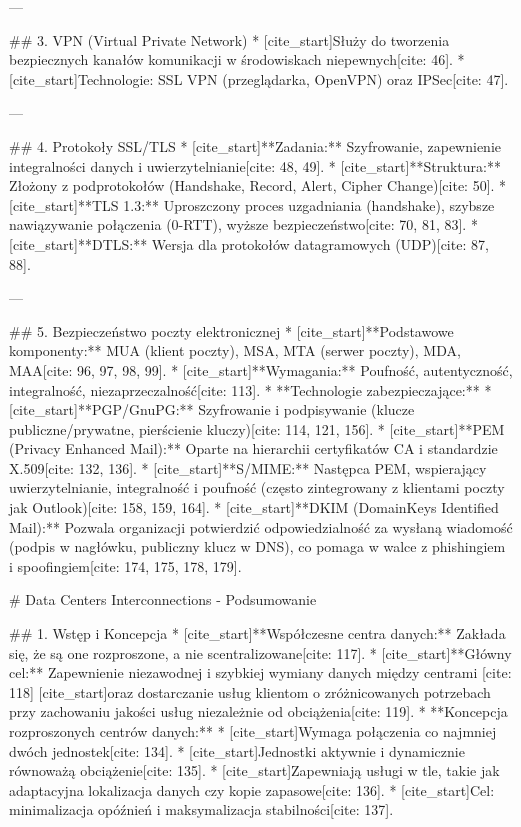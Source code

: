 ---

## 3. VPN (Virtual Private Network)
* [cite_start]Służy do tworzenia bezpiecznych kanałów komunikacji w środowiskach niepewnych[cite: 46].
* [cite_start]Technologie: SSL VPN (przeglądarka, OpenVPN) oraz IPSec[cite: 47].

---

## 4. Protokoły SSL/TLS
* [cite_start]**Zadania:** Szyfrowanie, zapewnienie integralności danych i uwierzytelnianie[cite: 48, 49].
* [cite_start]**Struktura:** Złożony z podprotokołów (Handshake, Record, Alert, Cipher Change)[cite: 50].
* [cite_start]**TLS 1.3:** Uproszczony proces uzgadniania (handshake), szybsze nawiązywanie połączenia (0-RTT), wyższe bezpieczeństwo[cite: 70, 81, 83].
* [cite_start]**DTLS:** Wersja dla protokołów datagramowych (UDP)[cite: 87, 88].

---

## 5. Bezpieczeństwo poczty elektronicznej
* [cite_start]**Podstawowe komponenty:** MUA (klient poczty), MSA, MTA (serwer poczty), MDA, MAA[cite: 96, 97, 98, 99].
* [cite_start]**Wymagania:** Poufność, autentyczność, integralność, niezaprzeczalność[cite: 113].
* **Technologie zabezpieczające:**
    * [cite_start]**PGP/GnuPG:** Szyfrowanie i podpisywanie (klucze publiczne/prywatne, pierścienie kluczy)[cite: 114, 121, 156].
    * [cite_start]**PEM (Privacy Enhanced Mail):** Oparte na hierarchii certyfikatów CA i standardzie X.509[cite: 132, 136].
    * [cite_start]**S/MIME:** Następca PEM, wspierający uwierzytelnianie, integralność i poufność (często zintegrowany z klientami poczty jak Outlook)[cite: 158, 159, 164].
    * [cite_start]**DKIM (DomainKeys Identified Mail):** Pozwala organizacji potwierdzić odpowiedzialność za wysłaną wiadomość (podpis w nagłówku, publiczny klucz w DNS), co pomaga w walce z phishingiem i spoofingiem[cite: 174, 175, 178, 179].


# Data Centers Interconnections - Podsumowanie

## 1. Wstęp i Koncepcja
* [cite_start]**Współczesne centra danych:** Zakłada się, że są one rozproszone, a nie scentralizowane[cite: 117].
* [cite_start]**Główny cel:** Zapewnienie niezawodnej i szybkiej wymiany danych między centrami [cite: 118] [cite_start]oraz dostarczanie usług klientom o zróżnicowanych potrzebach przy zachowaniu jakości usług niezależnie od obciążenia[cite: 119].
* **Koncepcja rozproszonych centrów danych:**
    * [cite_start]Wymaga połączenia co najmniej dwóch jednostek[cite: 134].
    * [cite_start]Jednostki aktywnie i dynamicznie równoważą obciążenie[cite: 135].
    * [cite_start]Zapewniają usługi w tle, takie jak adaptacyjna lokalizacja danych czy kopie zapasowe[cite: 136].
    * [cite_start]Cel: minimalizacja opóźnień i maksymalizacja stabilności[cite: 137].

